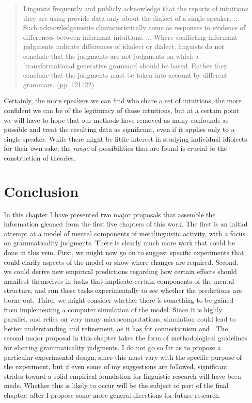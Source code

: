  \begin{quote}
 Linguists frequently and publicly acknowledge that the reports of intuitions they are using provide data only about the dialect of a single speaker. ... Such acknowledgements characteristically come as responses to evidence of differences between informant intuitions. ... Where conflicting informant judgments indicate differences of idiolect or dialect, linguists do not conclude that the judgments are not judgments on which a [transformational generative grammar] should be based. Rather they conclude that the judgments must be taken into account by different grammars. (pp. 121\textendash{}122)
 \end{quote}

 \noindent
 Certainly, the more speakers we can find who share a set of intuitions, the more confident we can be of the legitimacy of those intuitions, but at a certain point we will have to hope that our methods have removed as many confounds as possible and treat the resulting data as significant, even if it applies only to a single speaker. While there might be little interest in studying individual idiolects for their own sake, the \textit{range} of possibilities that are found is crucial to the construction of theories.

 \section{Conclusion}\label{sec:6.4}

 In this chapter I have presented two major proposals that assemble the information gleaned from the first five chapters of this work. The first is an initial attempt at a model of mental components of metalinguistic activity, with a focus on grammaticality judgments. There is clearly much more work that could be done in this vein. First, we might now go on to suggest specific experiments that could clarify aspects of the model or show where changes are required. Second, we could derive new empirical predictions regarding how certain effects should manifest themselves in tasks that implicate certain components of the mental structure, and run these tasks experimentally to see whether the predictions are borne out. Third, we might consider whether there is something to be gained from implementing a computer simulation of the model. Since it is highly parallel, and
 relies on very many microcomputations, simulation could lead to better understanding and refinement, as it has for connectionism and . The second major proposal  in this chapter takes the form of methodological guidelines for eliciting grammaticality judgments. I do not go so far as to propose a particular experimental design, since this must vary with the specific purpose of the experiment, but if even some of my suggestions are followed, significant strides toward a solid empirical foundation for linguistic research will have been made. Whether this is likely to occur will be the subject of part of the final chapter, after I propose some more general directions for future research.